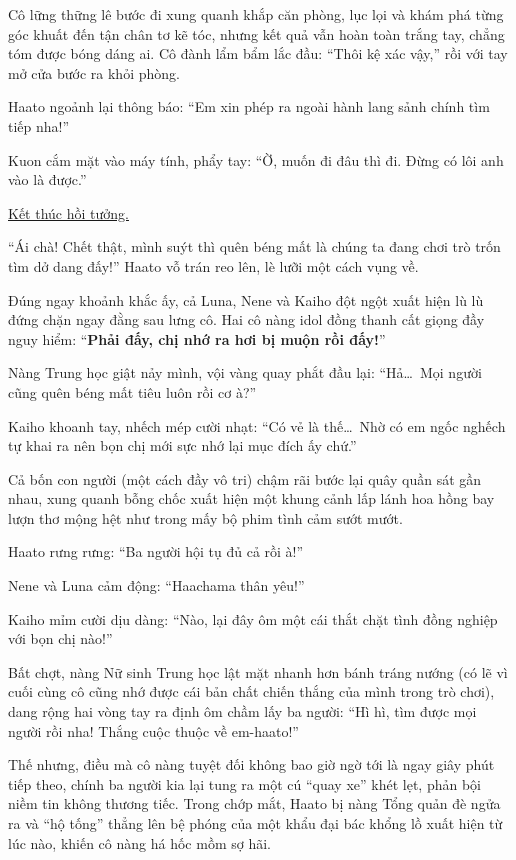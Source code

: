 \documentclass[../main.tex]{subfiles}
\begin{document}
Cô lững thững lê bước đi xung quanh khắp căn phòng, lục lọi và khám phá từng góc khuất đến tận chân tơ kẽ tóc, nhưng kết quả vẫn hoàn toàn trắng tay, chẳng tóm được bóng dáng ai. Cô đành lẩm bẩm lắc đầu: ``Thôi kệ xác vậy,'' rồi với tay mở cửa bước ra khỏi phòng.

Haato ngoảnh lại thông báo: ``Em xin phép ra ngoài hành lang sảnh chính tìm tiếp nha!''

Kuon cắm mặt vào máy tính, phẩy tay: ``Ờ, muốn đi đâu thì đi. Đừng có lôi anh vào là được.''

\begin{center}
    \uline{Kết thúc hồi tưởng.}
\end{center}

``Ái chà! Chết thật, mình suýt thì quên béng mất là chúng ta đang chơi trò trốn tìm dở dang đấy!'' Haato vỗ trán reo lên, lè lưỡi một cách vụng về.

Đúng ngay khoảnh khắc ấy, cả Luna, Nene và Kaiho đột ngột xuất hiện lù lù đứng chặn ngay đằng sau lưng cô. Hai cô nàng idol đồng thanh cất giọng đầy nguy hiểm: ``\textbf{Phải đấy, chị nhớ ra hơi bị muộn rồi đấy!}''


Nàng Trung học giật nảy mình, vội vàng quay phắt đầu lại: ``Hả\dots\ Mọi người cũng quên béng mất tiêu luôn rồi cơ à?''

Kaiho khoanh tay, nhếch mép cười nhạt: ``Có vẻ là thế\dots\ Nhờ có em ngốc nghếch tự khai ra nên bọn chị mới sực nhớ lại mục đích ấy chứ.''

Cả bốn con người (một cách đầy vô tri) chậm rãi bước lại quây quần sát gần nhau, xung quanh bỗng chốc xuất hiện một khung cảnh lấp lánh hoa hồng bay lượn thơ mộng hệt như trong mấy bộ phim tình cảm sướt mướt.

Haato rưng rưng: ``Ba người hội tụ đủ cả rồi à!''

Nene và Luna cảm động: ``Haachama thân yêu!''

Kaiho mỉm cười dịu dàng: ``Nào, lại đây ôm một cái thắt chặt tình đồng nghiệp với bọn chị nào!''


Bất chợt, nàng Nữ sinh Trung học lật mặt nhanh hơn bánh tráng nướng (có lẽ vì cuối cùng cô cũng nhớ được cái bản chất chiến thắng của mình trong trò chơi), dang rộng hai vòng tay ra định ôm chầm lấy ba người: ``Hì hì, tìm được mọi người rồi nha! Thắng cuộc thuộc về em-haato!''

Thế nhưng, điều mà cô nàng tuyệt đối không bao giờ ngờ tới là ngay giây phút tiếp theo, chính ba người kia lại tung ra một cú ``quay xe'' khét lẹt, phản bội niềm tin không thương tiếc. Trong chớp mắt, Haato bị nàng Tổng quản đè ngửa ra và ``hộ tống'' thẳng lên bệ phóng của một khẩu đại bác khổng lồ xuất hiện từ lúc nào, khiến cô nàng há hốc mồm sợ hãi.
\end{document}
